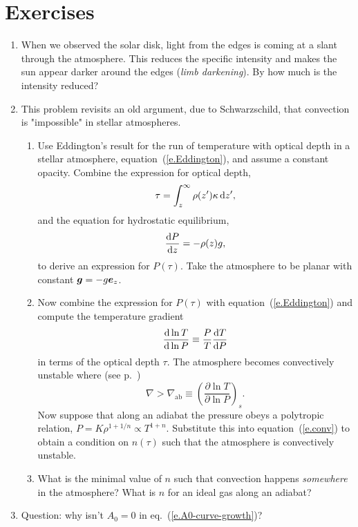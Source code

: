 \section{Exercises}
\begin{enumerate}
\item When we observed the solar disk, light from the edges is coming at a slant through the atmosphere. This reduces the specific intensity and makes the sun appear darker around the edges (\emph{limb darkening}). By how much is the intensity reduced? 

\item This problem revisits an old argument, due to Schwarzschild, that convection is "impossible" in stellar atmospheres.  
\begin{enumerate}
\item Use Eddington's result for the run of temperature with optical depth in a stellar atmosphere, equation~(\ref{e.Eddington}), 
and assume a constant opacity. Combine the expression for optical depth,
\[ \tau = \int_{z}^{\infty}\rho(z')\kappa\, \mathrm{d} z', \]
and the equation for hydrostatic equilibrium,
\[ \frac{\mathrm{d} P}{\mathrm{d} z} = -\rho(z)g, \]
to derive an expression for $P(\tau)$.  Take the atmosphere to be planar with constant $\boldsymbol{g} = -g\boldsymbol{e}_{z}$.

\item Now combine the expression for $P(\tau)$ with equation~(\ref{e.Eddington}) and compute the temperature gradient
\begin{equation}
\frac{\mathrm{d}\ln T}{\mathrm{d}\ln P} \equiv \frac{P}{T}\frac{\mathrm{d} T}{\mathrm{d} P}
\end{equation}
in terms of the optical depth $\tau$.  The atmosphere becomes convectively unstable where (see p.~\pageref{e.schwarzschild})
\begin{equation}\label{e.conv}
 \nabla > \nabla_{\mathrm{ab}} \equiv \left(\frac{\partial\ln T}{\partial\ln P}\right)_{s}.
\end{equation}
Now suppose that along an adiabat the pressure obeys a polytropic relation, $P = K\rho^{1+1/n} \propto T^{1+n}$. Substitute this into equation~(\ref{e.conv}) to obtain a condition on $n(\tau)$ such that the atmosphere is convectively unstable.

\item What is the minimal value of $n$ such that convection happens \emph{somewhere} in the atmosphere?  What is $n$ for an ideal gas along an adiabat?
\end{enumerate}

\item Question: why isn't $A_{0}=0$ in eq.~(\ref{e.A0-curve-growth})?

\end{enumerate}
